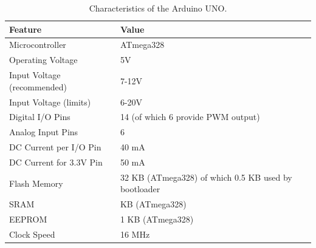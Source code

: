 \begin{table}[ht] 
\centering
\begin{tabular}{l|l}
    Feature     & Value\\
\hline
Microcontroller	& ATmega328\\
Operating Voltage &	5V\\
Input Voltage (recommended) & 7-12V\\
Input Voltage (limits) & 6-20V\\
Digital I/O Pins & 14 (of which 6 provide PWM output)\\
Analog Input Pins & 6\\
DC Current per I/O Pin & 40 mA\\
DC Current for 3.3V Pin & 50 mA\\
Flash Memory & 32 KB (ATmega328) of which 0.5 KB used by bootloader\\
SRAM & KB (ATmega328)\\
EEPROM &	1 KB (ATmega328)\\
Clock Speed &	16 MHz\\
\end{tabular}
\caption{Characteristics of the Arduino UNO.}
\end{table}
